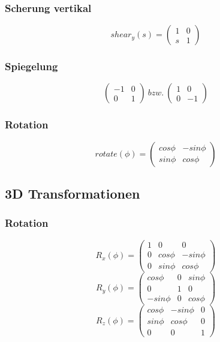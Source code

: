 \subsubsection{Scherung vertikal}
\[shear_y(s) = \begin{pmatrix} 1 & 0 \\ s & 1 \end{pmatrix}\]

\subsubsection{Spiegelung}
\[\begin{pmatrix} -1 & 0 \\ 0 & 1 \end{pmatrix}~bzw.~\begin{pmatrix} 1 & 0 \\ 0 & -1 \end{pmatrix}\]

\subsubsection{Rotation}
\[rotate(\phi) = \begin{pmatrix} cos\phi & -sin\phi \\ sin\phi & cos\phi \end{pmatrix}\]


\subsection{3D Transformationen}

\subsubsection{Rotation}
\[R_x(\phi) = \begin{pmatrix} 1 & 0 & 0 \\ 0 & cos\phi & -sin\phi \\ 0 & sin\phi & cos\phi \end{pmatrix}\]
\[R_y(\phi) = \begin{pmatrix} cos\phi & 0 & sin\phi \\ 0 & 1 & 0 \\ -sin\phi & 0 & cos\phi \end{pmatrix}\]
\[R_z(\phi) = \begin{pmatrix} cos\phi & -sin\phi & 0 \\ sin\phi & cos\phi & 0 \\ 0 & 0 & 1 \end{pmatrix}\]
